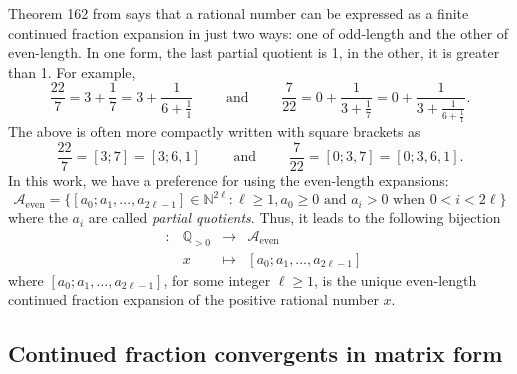 \documentclass[a4paper,12pt]{amsart}
\newcommand{\N}{\mathbb{N}}
\newcommand{\Q}{\mathbb{Q}}
\newcommand{\xx}{{x}}
\newcommand{\Acal}{{\mathcal{A}}}
\newcommand{\0}{\mathtt{0}}
\newcommand{\1}{\mathtt{1}}
\newcommand{\2}{\mathtt{2}}
\newcommand{\3}{\mathtt{3}}
\newcommand{\Acaleven}{{\Acal_{\text{even}}}}
\DeclareMathOperator{\CFeven}{{CF_{\text{even}}}}
\begin{document}
Theorem 162 from \cite{MR2445243} says that
a rational number can be expressed as a finite
continued fraction expansion in just two ways:
one of odd-length and the other of even-length.
In one form, the last partial quotient is 1,
in the other, it is greater than 1.
For example,
\[
    \frac{22}{7} = 3 + \frac{1}{7}
    = 3 + \frac{1}{
      6 + \frac{1}{1
      }}
      \qquad
      \text{ and }
      \qquad
    \frac{7}{22} = 0 + \frac{1}{3 + \frac{1}{7}}
    = 0 + \frac{1}{
      3 + \frac{1}{
      6 + \frac{1}{1
      }}}.
\]
The above is often more compactly written with square brackets as
\[
    \frac{22}{7}=[3;7] = [3;6,1]
      \qquad
      \text{ and }
      \qquad
    \frac{7}{22}=[0;3,7] = [0;3,6,1].
\]
In this work, we have a preference for using the
even-length expansions:
\[
\Acaleven=\{
    [a_0;a_1,\dots,a_{2\ell-1}]\in\N^{2\ell}
\colon
\ell\geq1,
a_0\geq0\text{ and }
a_i>0 \text{ when } 0<i<2\ell
\}
\]
where the $a_i$ are called \emph{partial quotients}.
Thus, it leads to the following bijection
\[
\begin{array}{rccl}
\CFeven:&\Q_{>0}&\to&\Acaleven\\
&\xx
&\mapsto
&[a_0;a_1,\dots,a_{2\ell-1}]
\end{array}
\]
where $[a_0;a_1,\dots,a_{2\ell-1}]$,
for some integer $\ell\geq1$,
is the unique even-length continued fraction expansion of the positive rational
number $\xx$.

\subsection{Continued fraction convergents in matrix form}
\end{document}
